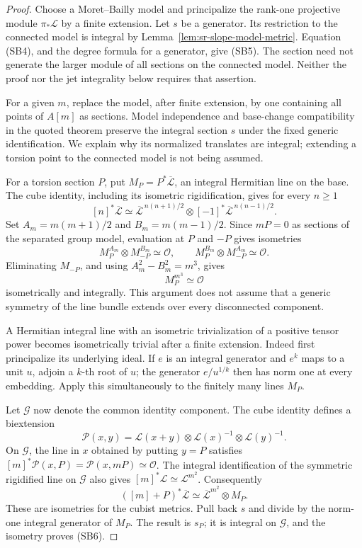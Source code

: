 \begin{proof}
Choose a Moret--Bailly model and principalize
the rank-one projective module
\(\pi_*\mathcal L\) by a finite extension.
Let \(s\) be a generator.
Its restriction to the connected model is
integral by Lemma~\ref{lem:sr-slope-model-metric}.
Equation (SB4), and the degree formula for a
generator, give (SB5).
The section need not generate the larger
module of all sections on the connected
model. Neither the proof nor the jet
integrality below requires that assertion.

For a given \(m\), replace the model, after
finite extension, by one containing all
points of \(A[m]\) as sections.
Model independence and base-change
compatibility in the quoted theorem preserve
the integral section \(s\) under the fixed
generic identification.
We explain why its normalized translates
are integral; extending a torsion point
to the connected model is not being assumed.

For a torsion section \(P\), put
\(M_P=P^*\overline{\mathcal L}\), an integral
Hermitian line on the base.
The cube identity, including its isometric
rigidification, gives for every \(n\ge1\)
\[
 [n]^*\overline{\mathcal L}
   \simeq
 \overline{\mathcal L}^{\,n(n+1)/2}
       \otimes[-1]^*\overline{\mathcal L}^{\,n(n-1)/2}.
\]
Set \(A_m=m(m+1)/2\) and \(B_m=m(m-1)/2\).
Since \(mP=0\) as sections of the separated
group model, evaluation at \(P\) and \(-P\)
gives isometries
\[
 M_P^{A_m}\otimes M_{-P}^{B_m}\simeq\mathcal O,
 \qquad
 M_P^{B_m}\otimes M_{-P}^{A_m}\simeq\mathcal O.
\]
Eliminating \(M_{-P}\), and using
\(A_m^2-B_m^2=m^3\), gives
\[
                         M_P^{m^3}\simeq\mathcal O   \tag{SB7}
\]
isometrically and integrally.
This argument does not assume that a generic
symmetry of the line bundle extends over
every disconnected component.

A Hermitian integral line with an isometric
trivialization of a positive tensor power
becomes isometrically trivial after a finite
extension.
Indeed first principalize its underlying
ideal. If \(e\) is an integral generator
and \(e^k\) maps to a unit \(u\), adjoin a
\(k\)-th root of \(u\); the generator
\(e/u^{1/k}\) then has norm one at every
embedding. Apply this simultaneously to the
finitely many lines \(M_P\).

Let \(\mathcal G\) now denote the common
identity component.
The cube identity defines a biextension
\[
 \mathcal P(x,y)=
 \mathcal L(x+y)\otimes\mathcal L(x)^{-1}
                              \otimes\mathcal L(y)^{-1}.
\]
On \(\mathcal G\), the line in \(x\) obtained
by putting \(y=P\) satisfies
\([m]^*\mathcal P(x,P)=\mathcal P(x,mP)
\simeq\mathcal O\).
The integral identification of the symmetric
rigidified line on \(\mathcal G\) also gives
\([m]^*\mathcal L\simeq\mathcal L^{m^2}\).
Consequently
\[
 ([m]+P)^*\overline{\mathcal L}
       \simeq\overline{\mathcal L}^{m^2}\otimes M_P.
\]
These are isometries for the cubist metrics.
Pull back \(s\) and divide by the norm-one
integral generator of \(M_P\).
The result is \(s_P\); it is integral on
\(\mathcal G\), and the isometry proves (SB6).


\end{proof}

